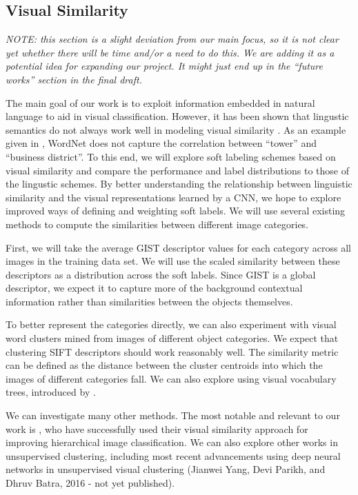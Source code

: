 \subsection{Visual Similarity}

\emph{
  NOTE: this section is a slight deviation from our main focus, so it is not
  clear yet whether there will be time and/or a need to do this. We are adding
  it as a potential idea for expanding our project. It might just end up in the
  ``future works'' section in the final draft.
}

The main goal of our work is to exploit information embedded in natural
language to aid in visual classification.
However, it has been shown that lingustic semantics do not always work well in
modeling visual similarity \cite{li2010building}. As an example given in
\cite{li2010building}, WordNet does not capture the correlation between
``tower'' and ``business district''.
To this end, we will explore soft labeling schemes based on visual similarity
and compare the performance and label distributions to those of the lingustic
schemes.
By better understanding the relationship between linguistic similarity and the
visual representations learned by a CNN, we hope to explore improved ways of
defining and weighting soft labels.
We will use several existing methods to compute the similarities between
different image categories.

First, we will take the average GIST descriptor \cite{oliva2001modeling} values
for each category across all images in the training data set. We will use the
scaled similarity between these descriptors as a distribution across the soft
labels.
Since GIST is a global descriptor, we expect it to capture more of the
background contextual information rather than similarities between the objects
themselves.

To better represent the categories directly, we can also experiment with
visual word clusters mined from images of different object categories.
We expect that clustering SIFT descriptors \cite{lowe1999object} should work
reasonably well.
The similarity metric can be defined as the distance between the cluster
centroids into which the images of different categories fall.
We can also explore using visual vocabulary trees, introduced by
\cite{nister2006scalable}.

We can investigate many other methods. The most notable and relevant to our
work is \cite{li2010building}, who have successfully used their visual
similarity approach for improving hierarchical image classification.
We can also explore other works in unsupervised clustering, including most
recent advancements using deep neural networks in unsupervised visual
clustering
(Jianwei Yang, Devi Parikh, and Dhruv Batra, 2016 - not yet published).

